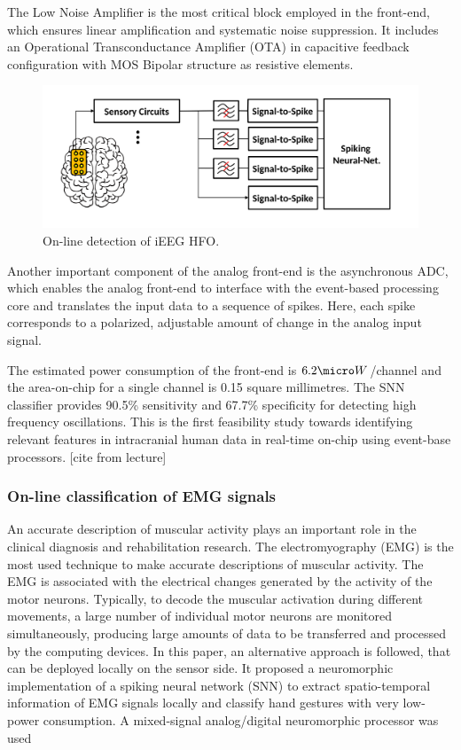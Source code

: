 \documentclass[main]{subfiles}
\begin{document}
The Low Noise Amplifier is the most critical block employed in the front-end, which ensures linear amplification and systematic noise suppression. It includes an Operational Transconductance Amplifier (OTA) in capacitive feedback configuration with MOS Bipolar structure as resistive elements.

%
\begin{figure}[h]
    \centering
    \includegraphics[width=0.8\linewidth]{12_NeuromorphicSystems2/figures/eeg.PNG}
    \caption{On-line detection of iEEG HFO.}
    \label{fig:eeg}
\end{figure}
%

Another important component of the analog front-end is the asynchronous ADC, which enables the analog front-end to interface with the event-based processing core and translates the input data to a sequence of spikes. Here, each spike corresponds to a polarized, adjustable amount of change
in the analog input signal.

The estimated power consumption of the front-end is $6.2 \micro W$/channel and the area-on-chip for a single channel is 0.15 square millimetres. The SNN classifier provides 90.5\% sensitivity and 67.7\% specificity for detecting high frequency oscillations. This is the first feasibility study towards identifying relevant features in intracranial human data in real-time on-chip using event-base processors. [cite from lecture]

\subsubsection{On-line classification of EMG signals}

An accurate description of muscular activity plays an important role in the clinical diagnosis and rehabilitation research. The electromyography (EMG) is the most used technique to make accurate descriptions of muscular activity. The EMG is associated with the electrical changes generated by the activity of the motor neurons. Typically, to decode the muscular activation during different movements, a large number of individual motor neurons are monitored simultaneously, producing large amounts of data to be transferred and processed by the computing devices. In this paper, an alternative approach is followed, that can be deployed locally on the sensor side. It proposed a neuromorphic implementation of a spiking neural network (SNN) to extract spatio-temporal information of EMG signals locally and classify hand gestures with very low-power consumption. A mixed-signal analog/digital neuromorphic processor was used
\end{document}
